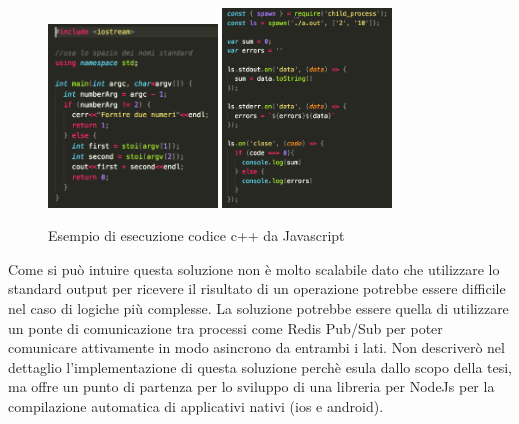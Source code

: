 \begin{figure}[h]
\centering
\includegraphics[width=0.4\textwidth]{images/cppCode.png}
\includegraphics[width=0.4\textwidth]{images/jsCode.png}
\caption{Esempio di esecuzione codice c++ da Javascript}
\end{figure}

\vspace{5mm}Come si può intuire questa soluzione non è molto scalabile dato che utilizzare lo standard output per ricevere il risultato di un operazione potrebbe essere difficile nel caso di logiche più complesse. La soluzione potrebbe essere quella di utilizzare un ponte di comunicazione tra processi come Redis Pub/Sub \cite{PubSubRedis} per poter comunicare attivamente in modo asincrono da entrambi i lati. Non descriverò nel dettaglio l'implementazione di questa soluzione perchè esula dallo scopo della tesi, ma offre un punto di partenza per lo sviluppo di una libreria per NodeJs per la compilazione automatica di applicativi nativi (ios e android).









